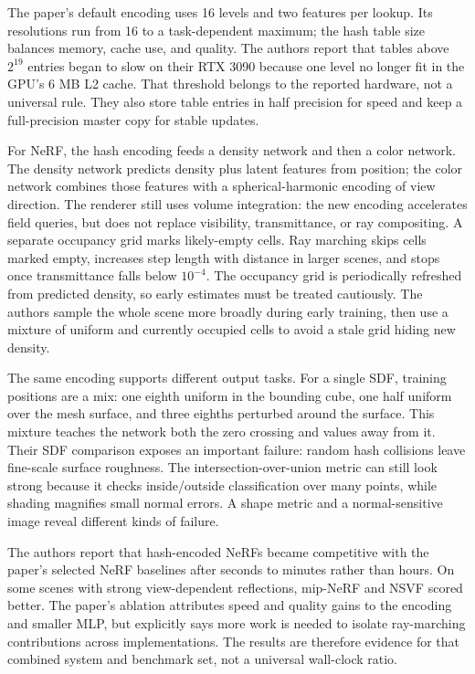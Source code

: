 The paper's default encoding uses 16 levels and two features per lookup. Its resolutions run from 16 to a task-dependent maximum; the hash table size balances memory, cache use, and quality. The authors report that tables above \(2^{19}\) entries began to slow on their RTX 3090 because one level no longer fit in the GPU's 6 MB L2 cache. That threshold belongs to the reported hardware, not a universal rule. They also store table entries in half precision for speed and keep a full-precision master copy for stable updates.

For NeRF, the hash encoding feeds a density network and then a color network. The density network predicts density plus latent features from position; the color network combines those features with a spherical-harmonic encoding of view direction. The renderer still uses volume integration: the new encoding accelerates field queries, but does not replace visibility, transmittance, or ray compositing. A separate occupancy grid marks likely-empty cells. Ray marching skips cells marked empty, increases step length with distance in larger scenes, and stops once transmittance falls below \(10^{-4}\). The occupancy grid is periodically refreshed from predicted density, so early estimates must be treated cautiously. The authors sample the whole scene more broadly during early training, then use a mixture of uniform and currently occupied cells to avoid a stale grid hiding new density.

The same encoding supports different output tasks. For a single SDF, training positions are a mix: one eighth uniform in the bounding cube, one half uniform over the mesh surface, and three eighths perturbed around the surface. This mixture teaches the network both the zero crossing and values away from it. Their SDF comparison exposes an important failure: random hash collisions leave fine-scale surface roughness. The intersection-over-union metric can still look strong because it checks inside/outside classification over many points, while shading magnifies small normal errors. A shape metric and a normal-sensitive image reveal different kinds of failure.

The authors report that hash-encoded NeRFs became competitive with the paper's selected NeRF baselines after seconds to minutes rather than hours. On some scenes with strong view-dependent reflections, mip-NeRF and NSVF scored better. The paper's ablation attributes speed and quality gains to the encoding and smaller MLP, but explicitly says more work is needed to isolate ray-marching contributions across implementations. The results are therefore evidence for that combined system and benchmark set, not a universal wall-clock ratio.

